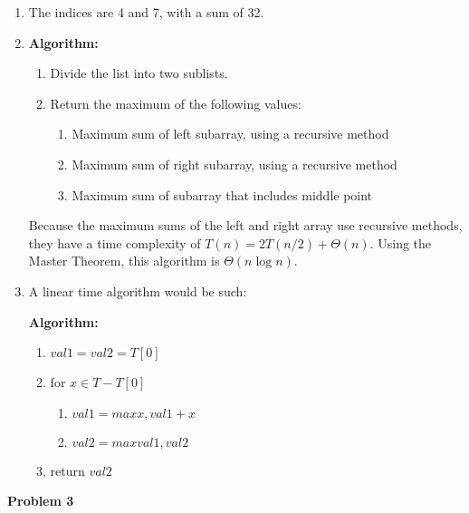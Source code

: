 \documentclass{article}
\newcommand{\Problem}[1]{\textbf{Problem #1}}
\begin{document}
\begin{enumerate}

\item The indices are 4 and 7, with a sum of 32. 

\item 

\textbf{Algorithm:}
\begin{enumerate}

\item Divide the list into two sublists.
\item Return the maximum of the following values:
\begin{enumerate}
\item Maximum sum of left subarray, using a recursive method
\item Maximum sum of right subarray, using a recursive method
\item Maximum sum of subarray that includes middle point
\end{enumerate}

\end{enumerate}

Because the maximum sums of the left and right array use recursive methods, they have a time complexity of $T(n) = 2T(n/2) + \Theta(n)$. 
Using the Master Theorem, this algorithm is $\Theta(n\log{n})$. 

\item 

A linear time algorithm would be such:

\textbf{Algorithm:}

\begin{enumerate}

\item $val1 = val2 = T[0]$
\item for $x \in T - {T[0]}$
\begin{enumerate}
\item $val1 = max{x, val1 + x}$
\item $val2 = max{val1,val2}$
\end{enumerate}
\item return $val2$

\end{enumerate}

\end{enumerate}

\Problem{3}
\end{document}
